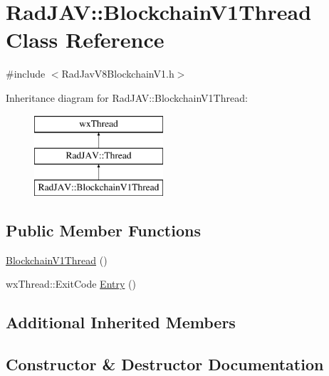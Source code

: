 \hypertarget{class_rad_j_a_v_1_1_blockchain_v1_thread}{}\section{Rad\+J\+AV\+:\+:Blockchain\+V1\+Thread Class Reference}
\label{class_rad_j_a_v_1_1_blockchain_v1_thread}


{\ttfamily \#include $<$Rad\+Jav\+V8\+Blockchain\+V1.\+h$>$}

Inheritance diagram for Rad\+J\+AV\+:\+:Blockchain\+V1\+Thread\+:\begin{figure}[H]
\begin{center}
\leavevmode
\includegraphics[height=3.000000cm]{class_rad_j_a_v_1_1_blockchain_v1_thread}
\end{center}
\end{figure}
\subsection*{Public Member Functions}
\begin{DoxyCompactItemize}
\item 
\mbox{\hyperlink{class_rad_j_a_v_1_1_blockchain_v1_thread_a419c53c19de683ed3448954eab6d56d8}{Blockchain\+V1\+Thread}} ()
\item 
wx\+Thread\+::\+Exit\+Code \mbox{\hyperlink{class_rad_j_a_v_1_1_blockchain_v1_thread_a379ed99f7db5d5fc77df43e87243f0d1}{Entry}} ()
\end{DoxyCompactItemize}
\subsection*{Additional Inherited Members}


\subsection{Constructor \& Destructor Documentation}
\mbox{\label{class_rad_j_a_v_1_1_blockchain_v1_thread_a419c53c19de683ed3448954eab6d56d8}} 
